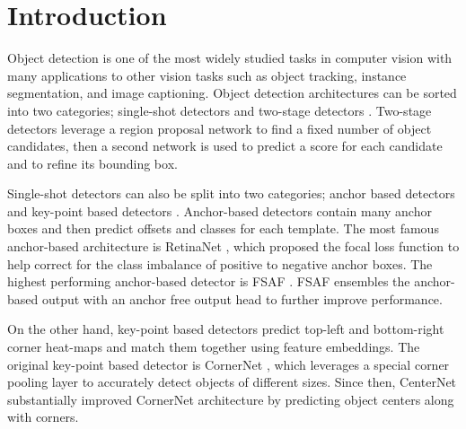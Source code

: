 \documentclass[10pt,twocolumn,letterpaper]{article}
\begin{document}
\section{Introduction}
Object detection is one of the most widely studied tasks in computer vision with many applications to other vision tasks such as object tracking, instance segmentation, and image captioning. Object detection architectures can be sorted into two categories; single-shot detectors \cite{lin2017focal, law2018cornernet} and two-stage detectors \cite{li2019scale}. Two-stage detectors leverage a region proposal network to find a fixed number of object candidates, then a second network is used to predict a score for each candidate and to refine its bounding box.

Single-shot detectors can also be split into two categories; anchor based detectors \cite{lin2017focal, zhu2019feature} and key-point based detectors \cite{law2018cornernet, duan2019centernet}. Anchor-based detectors contain many anchor boxes and then predict offsets and classes for each template. The most famous anchor-based architecture is RetinaNet \cite{lin2017focal}, which proposed the focal loss function to help correct for the class imbalance of positive to negative anchor boxes. The highest performing anchor-based detector is FSAF \cite{zhu2019feature}. FSAF ensembles the anchor-based output with an anchor free output head to further improve performance.

On the other hand, key-point based detectors predict top-left and bottom-right corner heat-maps and match them together using feature embeddings. The original key-point based detector is CornerNet \cite{law2018cornernet}, which leverages a special corner pooling layer to accurately detect objects of different sizes. Since then, CenterNet \cite{duan2019centernet}
substantially improved CornerNet architecture by predicting object centers along with corners.
\end{document}
